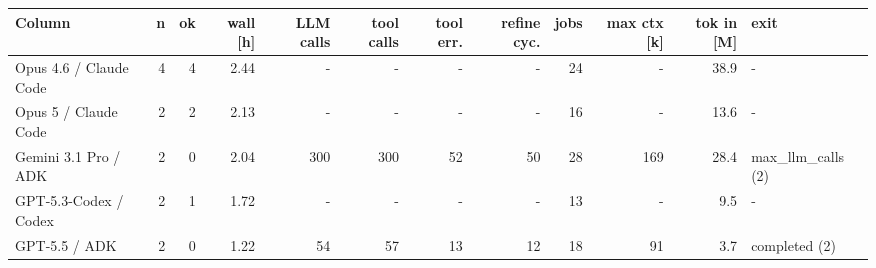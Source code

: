 \begin{tabular}{lrrrrrrrrrrl}
\toprule
Column & n & ok & wall [h] & LLM calls & tool calls & tool err. & refine cyc. & jobs & max ctx [k] & tok in [M] & exit \\
\midrule
Opus 4.6 / Claude Code & 4 & 4 & 2.44 & - & - & - & - & 24 & - & 38.9 & - \\
Opus 5 / Claude Code & 2 & 2 & 2.13 & - & - & - & - & 16 & - & 13.6 & - \\
Gemini 3.1 Pro / ADK & 2 & 0 & 2.04 & 300 & 300 & 52 & 50 & 28 & 169 & 28.4 & max\_llm\_calls (2) \\
GPT-5.3-Codex / Codex & 2 & 1 & 1.72 & - & - & - & - & 13 & - & 9.5 & - \\
GPT-5.5 / ADK & 2 & 0 & 1.22 & 54 & 57 & 13 & 12 & 18 & 91 & 3.7 & completed (2) \\
\bottomrule
\end{tabular}
